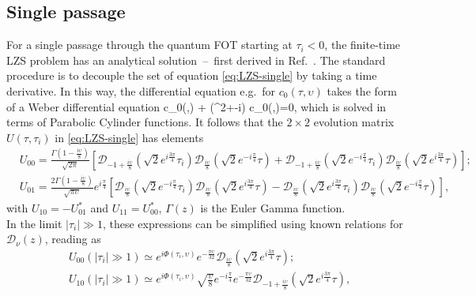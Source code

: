 \subsection{Single passage}\label{app:LZS-single}
For a single passage through the quantum FOT starting at $\tau_i<0$, the finite-time LZS problem has an analytical solution~--~first derived in Ref.~\cite{vitanov1996landau}. The standard procedure is to decouple the set of equation \eqref{eq:LZS-single} by taking a time derivative. In this way, the differential equation e.g.~for $c_0(\tau,\upsilon)$ takes the form of a Weber differential equation
\be
{}c_0(\tau,\upsilon) + (\tau^2+-i) c_0(\tau,\upsilon)=0,
\ee
which is solved in terms of Parabolic Cylinder functions. It follows that the $2\times 2$ evolution matrix $U(\tau,\tau_i)$ in \eqref{eq:LZS-single} has elements
\begin{subequations}
\begin{align}
&U_{00}=\frac{\Gamma(1-\frac{i\upsilon}{8})}{\sqrt{2\pi}}\left[\mathscr{D}_{-1+\frac{i\upsilon}{8}}(\sqrt{2}e^{i\frac{3\pi}{4}}\tau_i)\mathscr{D}_{\frac{i\upsilon}{8}}(\sqrt{2}e^{-i\frac{\pi}{4}}\tau) + \mathscr{D}_{-1+\frac{i\upsilon}{8}}(\sqrt{2}e^{-i\frac{\pi}{4}}\tau_i) \mathscr{D}_{\frac{i\upsilon}{8}}(\sqrt{2}e^{i\frac{3\pi}{4}}\tau)\right];\\[4pt]
&U_{01}=\frac{2\Gamma(1-\frac{i\upsilon}{8})}{\sqrt{\pi\upsilon}}e^{i\frac{\pi}{4}}\left[\mathscr{D}_{\frac{i\upsilon}{8}}(\sqrt{2}e^{-i\frac{\pi}{4}}\tau_i)\mathscr{D}_{\frac{i\upsilon}{8}}(\sqrt{2}e^{i\frac{3\pi}{4}}\tau) - \mathscr{D}_{\frac{i\upsilon}{8}}(\sqrt{2}e^{i\frac{3\pi}{4}}\tau_i) \mathscr{D}_{\frac{i\upsilon}{8}}(\sqrt{2}e^{-i\frac{\pi}{4}}\tau)\right],
\end{align}
\end{subequations}
with $U_{10}=-U_{01}^*$ and $U_{11}=U_{00}^*$, $\Gamma(z)$ is the Euler Gamma function.\\
In the limit $|\tau_i|\gg 1$, these expressions can be simplified using known relations for $\mathscr{D}_\nu(z)$, reading as
\begin{subequations}\label{eq:U-large}
\begin{align}
&U_{00}(|\tau_i|\gg 1)\simeq e^{i\Phi(\tau_i,\upsilon)} e^{-\frac{\pi\upsilon}{32}} \mathscr{D}_{\frac{i\upsilon}{8}}(\sqrt{2}e^{i\frac{3\pi}{4}}\tau);\\[4pt]
&U_{10}(|\tau_i|\gg 1)\simeq e^{i\Phi(\tau_i,\upsilon)}\sqrt{\frac{\upsilon}{8}} e^{-i\frac{\pi}{4}} e^{-\frac{\pi\upsilon}{32}} \mathscr{D}_{-1+\frac{i\upsilon}{8}}(\sqrt{2}e^{i\frac{3\pi}{4}}\tau),
\end{align}
\end{subequations}
